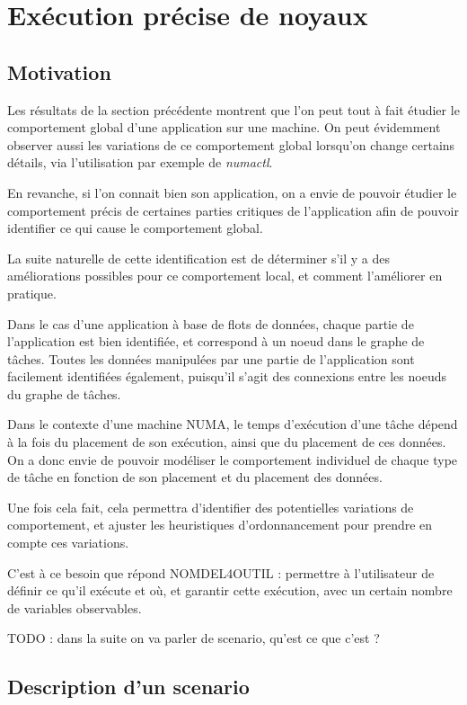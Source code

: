 \section{Exécution précise de noyaux}\label{sec:contribs:outil}

\subsection{Motivation}

Les résultats de la section précédente montrent que l'on peut tout à fait étudier le comportement global d'une application sur une machine. On peut évidemment observer aussi les variations de ce comportement global lorsqu'on change certains détails, via l'utilisation par exemple de \emph{numactl}.

En revanche, si l'on connait bien son application, on a envie de pouvoir étudier le comportement précis de certaines parties critiques de l'application afin de pouvoir identifier ce qui cause le comportement global.

La suite naturelle de cette identification est de déterminer s'il y a des améliorations possibles pour ce comportement local, et comment l'améliorer en pratique.

Dans le cas d'une application à base de flots de données, chaque partie de l'application est bien identifiée, et correspond à un noeud dans le graphe de tâches.
Toutes les données manipulées par une partie de l'application sont facilement identifiées également, puisqu'il s'agit des connexions entre les noeuds du graphe de tâches.

Dans le contexte d'une machine NUMA, le temps d'exécution d'une tâche dépend à la fois du placement de son exécution, ainsi que du placement de ces données. On a donc envie de pouvoir modéliser le comportement individuel de chaque type de tâche en fonction de son placement et du placement des données.

Une fois cela fait, cela permettra d'identifier des potentielles variations de comportement, et ajuster les heuristiques d'ordonnancement pour prendre en compte ces variations.

C'est à ce besoin que répond NOMDEL4OUTIL : permettre à l'utilisateur de définir ce qu'il exécute et où, et garantir cette exécution, avec un certain nombre de variables observables.


TODO : dans la suite on va parler de scenario, qu'est ce que c'est ?

\subsection{Description d'un scenario}

